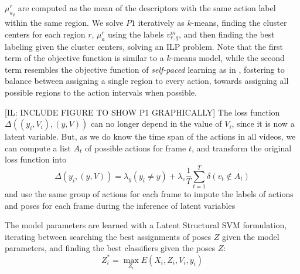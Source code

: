 $\mu_{a_q}^r$ are computed as the mean of the descriptors with the same action 
label within the same region. We solve $P1$ iteratively as $k$-means,  finding 
the cluster centers for each region $r$, $\mu_{a}^r$ using the labels 
$v_{r,q}^m$, and then finding the best labeling given the cluster centers, 
solving an ILP problem. Note that the first term of the objective function is 
similar to a $k$-means model, while the second term resembles the objective 
function of \emph{self-paced} learning as in \cite{Kumar:EtAl:2010}, fostering to 
balance between assigning a single region to every action, towards assigning 
all 
possible regions to the action intervals when possible.  

[IL: INCLUDE  FIGURE TO SHOW P1 GRAPHICALLY]
The loss function $\Delta((y_i,V_i),(y,V))$ can no longer depend in the value 
of $V_i$, since it is now a latent variable. But, as we do know the time span 
of the actions in all videos, we can compute a list $A_t$ of possible actions 
for frame $t$, and transform the original loss function into
\begin{equation}
\Delta(y_i,(y,V)) = \lambda_y(y_i \ne y) + \lambda_v\frac{1}{T}\sum_{t=1}^T 
\delta(v_t \notin A_t)
\end{equation}
and use the same group of actions for each frame to impute the labels of 
actions 
and poses for each frame during the inference of latent variables

The model parameters are learned with a Latent Structural SVM formulation, 
iterating between searching the best assignments of poses $Z$ given the model 
parameters, and finding the best classifiers given the poses $Z$:
\begin{equation}
 Z_i^* = \max_{Z_i} E(X_i, Z_i, V_i, y_i)
\end{equation}
